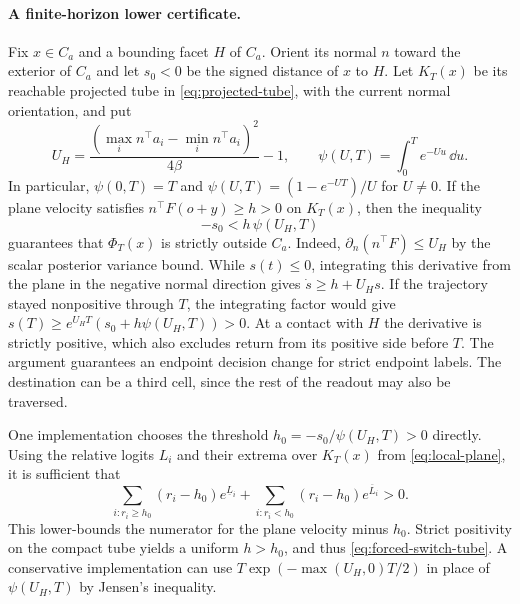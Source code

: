 \paragraph{A finite-horizon lower certificate.}
Fix $x\in C_a$ and a bounding facet $H$ of $C_a$. Orient its normal
$n$ toward the exterior of $C_a$ and let $s_0<0$ be the signed
distance of $x$ to $H$. Let $K_T(x)$ be its reachable projected tube in
\eqref{eq:projected-tube}, with the current normal orientation, and put
\[
 U_H=\frac{(\max_i n^\top a_i-\min_i n^\top a_i)^2}{4\beta}-1,
 \qquad \psi(U,T)=\int_0^T e^{-Uu}\,\dd u.
\]
In particular, $\psi(0,T)=T$ and
$\psi(U,T)=(1-e^{-UT})/U$ for $U\ne0$.
If the plane velocity satisfies $n^\top F(o+y)\ge h>0$ on $K_T(x)$,
then the inequality
\begin{equation}
       -s_0<h\,\psi(U_H,T)
       \label{eq:forced-switch-tube}
\end{equation}
guarantees that $\Phi_T(x)$ is strictly outside $C_a$.
Indeed, $\partial_n(n^\top F)\le U_H$ by the scalar posterior variance
bound. While $s(t)\le0$, integrating this derivative from the plane
in the negative normal direction gives $\dot s\ge h+U_Hs$. If the
trajectory stayed nonpositive through $T$, the integrating factor
would give $s(T)\ge e^{U_HT}(s_0+h\psi(U_H,T))>0$. At a contact with
$H$ the derivative is strictly positive, which also excludes return
from its positive side before $T$. The argument guarantees an endpoint
decision change for strict endpoint labels. The destination can be a
third cell, since the rest of the readout may also be traversed.

One implementation chooses the threshold
$h_0=-s_0/\psi(U_H,T)>0$ directly. Using the relative logits $L_i$ and
their extrema over $K_T(x)$ from \eqref{eq:local-plane}, it is
sufficient that
\begin{equation}
 \sum_{i:r_i\ge h_0}(r_i-h_0)e^{\underline L_i}
 +\sum_{i:r_i<h_0}(r_i-h_0)e^{\overline L_i}>0 .
 \label{eq:local-forced-switch}
\end{equation}
This lower-bounds the numerator for the plane velocity minus $h_0$.
Strict positivity on the compact tube yields a uniform $h>h_0$,
and thus \eqref{eq:forced-switch-tube}. A conservative implementation
can use $T\exp(-\max(U_H,0)T/2)$ in place of $\psi(U_H,T)$ by Jensen's
inequality.

